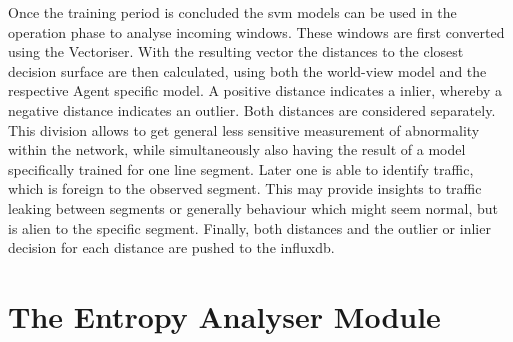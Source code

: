 Once the training period is concluded the \gls{svm} models can be used in the operation phase to analyse incoming windows.
These windows are first converted using the Vectoriser. With the resulting vector the distances to the closest decision surface are then calculated, using both the world-view model and the respective Agent specific model.
A positive distance indicates a inlier, whereby a negative distance indicates an outlier.
Both distances are considered separately. This division allows to get general less sensitive measurement of abnormality within the network, while simultaneously also having the result of a model specifically trained for one line segment. Later one is able to identify traffic, which is foreign to the observed segment. This may provide insights to traffic leaking between segments or generally behaviour which might seem normal, but is alien to the specific segment.
Finally, both distances and the outlier or inlier decision for each distance are pushed to the \gls{influxdb}.

\section{The Entropy Analyser Module}
\label{sec:impl:entropy}
